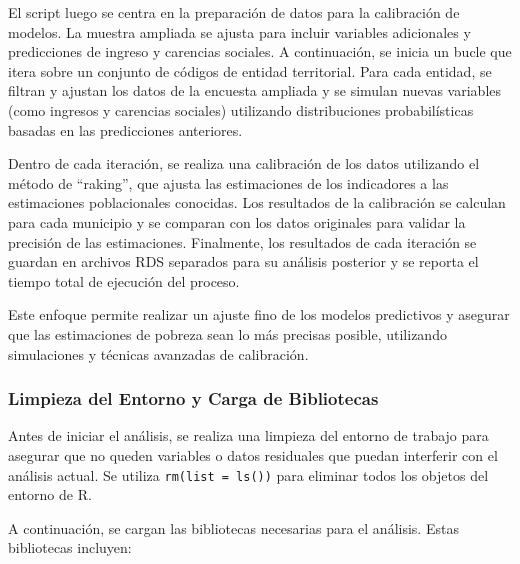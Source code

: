 \documentclass[
  12pt,
]{book}
\begin{document}
El script luego se centra en la preparación de datos para la calibración de modelos. La muestra ampliada se ajusta para incluir variables adicionales y predicciones de ingreso y carencias sociales. A continuación, se inicia un bucle que itera sobre un conjunto de códigos de entidad territorial. Para cada entidad, se filtran y ajustan los datos de la encuesta ampliada y se simulan nuevas variables (como ingresos y carencias sociales) utilizando distribuciones probabilísticas basadas en las predicciones anteriores.

Dentro de cada iteración, se realiza una calibración de los datos utilizando el método de ``raking'', que ajusta las estimaciones de los indicadores a las estimaciones poblacionales conocidas. Los resultados de la calibración se calculan para cada municipio y se comparan con los datos originales para validar la precisión de las estimaciones. Finalmente, los resultados de cada iteración se guardan en archivos RDS separados para su análisis posterior y se reporta el tiempo total de ejecución del proceso.

Este enfoque permite realizar un ajuste fino de los modelos predictivos y asegurar que las estimaciones de pobreza sean lo más precisas posible, utilizando simulaciones y técnicas avanzadas de calibración.

\hypertarget{limpieza-del-entorno-y-carga-de-bibliotecas-9}{%
\subsubsection*{Limpieza del Entorno y Carga de Bibliotecas}\label{limpieza-del-entorno-y-carga-de-bibliotecas-9}}

Antes de iniciar el análisis, se realiza una limpieza del entorno de trabajo para asegurar que no queden variables o datos residuales que puedan interferir con el análisis actual. Se utiliza \texttt{rm(list\ =\ ls())} para eliminar todos los objetos del entorno de R.

A continuación, se cargan las bibliotecas necesarias para el análisis. Estas bibliotecas incluyen:
\end{document}
